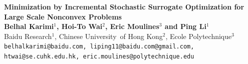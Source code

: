 \documentclass[a0,landscape]{a0poster}
\begin{document}

\begin{minipage}[b]{0.9\linewidth}
\veryHuge \color{Navy} \textbf{Minimization by Incremental Stochastic Surrogate Optimization for Large Scale Nonconvex Problems
}\\[1cm] \color{Black} %
\huge \textbf{Belhal Karimi$^{1}$, Hoi-To Wai$^{2}$, Eric Moulines$^{3}$ and Ping Li$^{1}$}\\[0.5cm] %
\huge Baidu Research$^1$, Chinese University~of Hong Kong$^2$, Ecole Polytechnique$^3$ \\[0.4cm] %
\large \texttt{belhalkarimi@baidu.com, liping11@baidu.com@gmail.com, htwai@se.cuhk.edu.hk, eric.moulines@polytechnique.edu}
\end{minipage}
%


\vspace{1cm} %

\end{document}
